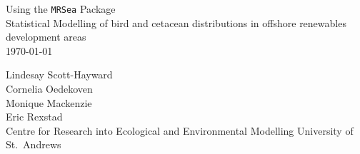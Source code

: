 
\begin{titlepage}

\begin{center}
\vspace* {0.70 in}
\huge{Using the {\tt MRSea} Package}\\[0.5 cm]
\Large{Statistical Modelling of bird and cetacean distributions in offshore renewables development areas}\\
\vspace{0.3 in}
\today

\vspace{1 in}
\Large{Lindesay Scott-Hayward}\\
\Large{Cornelia Oedekoven}\\
\Large{Monique Mackenzie}\\
\Large{Eric Rexstad}\\[0.5 cm]

\vspace{0.7 in}
\Large{Centre for Research into Ecological and Environmental Modelling}
\Large{University of St.\ Andrews}


\thispagestyle{empty}

\end{center}

\end{titlepage}
